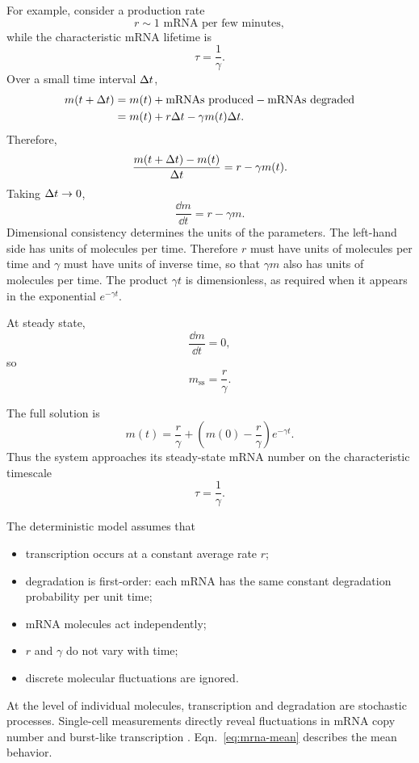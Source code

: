 For example, consider a production rate
\[
    r \sim 1 \text{ mRNA per few minutes},
\]
while the characteristic mRNA lifetime is
\[
    \tau = \frac{1}{\gamma}.
\]
Over a small time interval $\Delta t$,
\begin{align*}
    m(t+\Delta t) &= m(t) + \text{mRNAs produced} - \text{mRNAs degraded}
    \\
    &= m(t) + r\Delta t - \gamma m(t)\Delta t.
\end{align*}
Therefore,
\[
    \frac{m(t+\Delta t)-m(t)}{\Delta t} = r-\gamma m(t).
\]
Taking $\Delta t \rightarrow 0$,
\begin{equation}
    \frac{\dd m}{\dd t} = r-\gamma m.
    \label{eq:mrna-mean}
\end{equation}
Dimensional consistency determines the units of the parameters.
The left-hand side has units of molecules per time.
Therefore $r$ must have units of molecules per time and $\gamma$ must have units of inverse time, so that $\gamma m$ also has units of molecules per time.
The product $\gamma t$ is dimensionless, as required when it appears in the exponential $e^{-\gamma t}$.

At steady state,
\[
    \frac{\dd m}{\dd t}=0,
\]
 so
\[
    m_{\mathrm{ss}} = \frac{r}{\gamma}.
\]

The full solution is
\[
    m(t) = \frac{r}{\gamma} + \left( m(0)-\frac{r}{\gamma} \right) e^{-\gamma t}.
\]
Thus the system approaches its steady-state mRNA number on the characteristic timescale
\[
    \tau = \frac{1}{\gamma}.
\]

The deterministic model assumes that

\begin{itemize}
    \item transcription occurs at a constant average rate $r$;
    \item degradation is first-order: each mRNA has the same constant degradation probability per unit time;
    \item mRNA molecules act independently;
    \item $r$ and $\gamma$ do not vary with time;
    \item discrete molecular fluctuations are ignored.
\end{itemize}

At the level of individual molecules, transcription and degradation are stochastic processes.
Single-cell measurements directly reveal fluctuations in mRNA copy number and burst-like transcription \cite{golding2005real,taniguchi2010quantifying}.
Eqn.~\eqref{eq:mrna-mean} describes the mean behavior.



